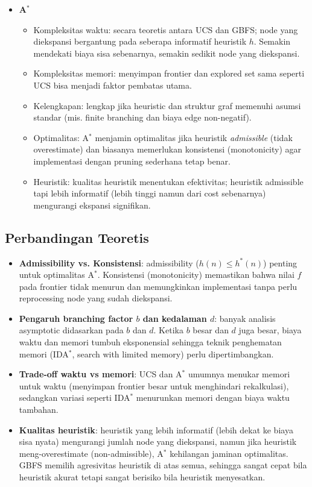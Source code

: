 \begin{itemize}
    \item \textbf{A$^\ast$}
          \begin{itemize}
              \item Kompleksitas waktu: secara teoretis antara UCS dan GBFS; node yang diekspansi bergantung pada seberapa informatif heuristik $h$. Semakin mendekati biaya sisa sebenarnya, semakin sedikit node yang diekspansi.
              \item Kompleksitas memori: menyimpan frontier dan explored set sama seperti UCS  bisa menjadi faktor pembatas utama.
              \item Kelengkapan: lengkap jika heuristic dan struktur graf memenuhi asumsi standar (mis. finite branching dan biaya edge non-negatif).
              \item Optimalitas: A$^\ast$ menjamin optimalitas jika heuristik \emph{admissible} (tidak overestimate) dan biasanya memerlukan konsistensi (monotonicity) agar implementasi dengan pruning sederhana tetap benar.
              \item Heuristik: kualitas heuristik menentukan efektivitas; heuristik admissible tapi lebih informatif (lebih tinggi namun dari cost sebenarnya) mengurangi ekspansi signifikan.
          \end{itemize}
\end{itemize}

\subsection{Perbandingan Teoretis}
\begin{itemize}
    \item \textbf{Admissibility vs. Konsistensi}: admissibility ($h(n) \le h^*(n)$) penting untuk optimalitas A$^\ast$. Konsistensi (monotonicity) memastikan bahwa nilai $f$ pada frontier tidak menurun dan memungkinkan implementasi tanpa perlu reprocessing node yang sudah diekspansi.

    \item \textbf{Pengaruh branching factor $b$ dan kedalaman $d$}: banyak analisis asymptotic didasarkan pada $b$ dan $d$. Ketika $b$ besar dan $d$ juga besar, biaya waktu dan memori tumbuh eksponensial sehingga teknik penghematan memori (IDA$^\ast$, search with limited memory) perlu dipertimbangkan.

    \item \textbf{Trade-off waktu vs memori}: UCS dan A$^\ast$ umumnya menukar memori untuk waktu (menyimpan frontier besar untuk menghindari rekalkulasi), sedangkan variasi seperti IDA$^\ast$ menurunkan memori dengan biaya waktu tambahan.

    \item \textbf{Kualitas heuristik}: heuristik yang lebih informatif (lebih dekat ke biaya sisa nyata) mengurangi jumlah node yang diekspansi, namun jika heuristik meng-overestimate (non-admissible), A$^\ast$ kehilangan jaminan optimalitas. GBFS memilih agresivitas heuristik di atas semua, sehingga sangat cepat bila heuristik akurat tetapi sangat berisiko bila heuristik menyesatkan.

\end{itemize}

